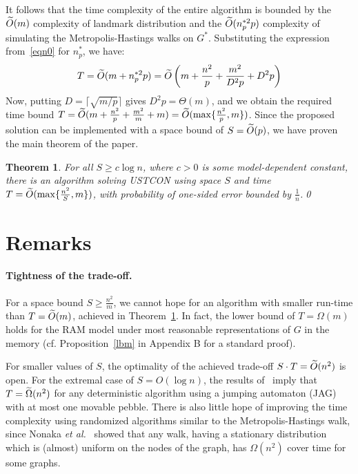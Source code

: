 \documentclass[11pt,a4paper]{article}
\newtheorem{theorem}{Theorem}
\newcommand{\etal}{\textsl{et al.}\xspace}
\renewcommand{\O}{\ensuremath \widetilde O}
\newcommand{\To}{\ensuremath \widetilde \Omega}
\renewcommand{\*}{\hspace*{5mm}}
\begin{document}
It follows that the time complexity of the entire algorithm is bounded by the $\O(m)$ complexity of landmark distribution and the $\O(n_p^{*2} p)$ complexity of simulating the Metropolis-Hastings walks on $G^*$. Substituting the expression from~\eqref{eqn0} for $n_p^*$, we have:
$$
T = \O (m + n_p^{*2} p) = \O \left (m + \frac{n^2}{p} + \frac{m^2}{D^2 p} + D^2 p\right)
$$
Now, putting $D = \lceil\sqrt{m/p}\rceil$ gives $D^2 p = \Theta(m)$, and we obtain the required time bound $T = \O(m + \frac{n^2}{p} + \frac{m^2}{m} + m) = \O(\max\{\frac{n^2}{p}, m\})$. Since the proposed solution can be implemented with a space bound of $S = \O(p)$, we have proven the main theorem of the paper.

\begin{theorem}\label{thm:main}
For all $S \geq c\log n$, where $c>0$ is some model-dependent constant, there is an algorithm solving USTCON using space $S$ and time $T=\O(\max\{\frac{n^2}{S}, m\})$, with probability of one-sided error bounded by $\frac{1}{n}$.\qed
\end{theorem}


\section{Remarks}\label{sec5}

\paragraph{Tightness of the trade-off.}\label{sec51}

For a space bound $S \geq \frac{n^2}{m}$, we cannot hope for an algorithm with smaller run-time than $T=\O(m)$, achieved in Theorem~\ref{thm:main}.
In fact, the lower bound of $T = \Omega(m)$ holds for the RAM model under most reasonable representations of $G$ in the memory (cf. Proposition~\ref{lbm} in Appendix B for a standard proof).

For smaller values of $S$, the optimality of the achieved trade-off $S\cdot T = \O(n^2)$ is open. For the extremal case of $S = O(\log n)$, the results of~\cite{BBRRT} imply that $T=\To(n^2)$ for any deterministic algorithm using a jumping automaton (JAG) with at most one movable pebble. There is also little hope of improving the time complexity using randomized algorithms similar to the Metropolis-Hastings walk, since Nonaka \etal~\cite{NOSY} showed that any walk, having a stationary distribution which is (almost) uniform on the nodes of the graph, has $\Omega(n^2)$ cover time for some graphs.
\end{document}
